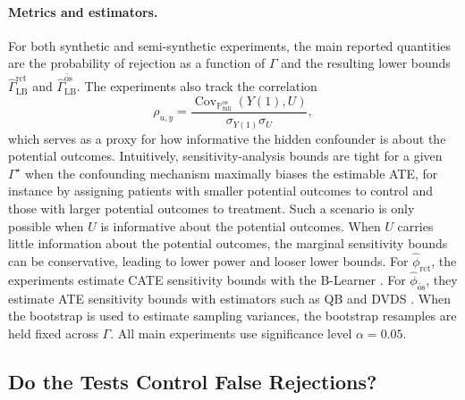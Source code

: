 \paragraph{Metrics and estimators.}
For both synthetic and semi-synthetic experiments, the main reported quantities are the probability of rejection as a function of \(\Gamma\) and the resulting lower bounds \(\widehat{\Gamma}_{\mathrm{LB}}^{\mathrm{rct}}\) and \(\widehat{\Gamma}_{\mathrm{LB}}^{\widetilde{\mathrm{os}}}\). The experiments also track the correlation
\[
  \rho_{u,y}
  =
  \frac{
    \operatorname{Cov}_{\mathbb{P}^{\mathrm{os}}_{\mathrm{full}}}(Y(1),U)
  }{
    \sigma_{Y(1)}\sigma_U
  },
\]
which serves as a proxy for how informative the hidden confounder is about the potential outcomes. Intuitively, sensitivity-analysis bounds are tight for a given \(\Gamma^{\star}\) when the confounding mechanism maximally biases the estimable ATE, for instance by assigning patients with smaller potential outcomes to control and those with larger potential outcomes to treatment. Such a scenario is only possible when \(U\) is informative about the potential outcomes. When \(U\) carries little information about the potential outcomes, the marginal sensitivity bounds can be conservative, leading to lower power and looser lower bounds. For \(\widehat{\phi}_{\mathrm{rct}}\), the experiments estimate CATE sensitivity bounds with the B-Learner \citep{oprescu2023b}. For \(\widehat{\phi}_{\widetilde{\mathrm{os}}}\), they estimate ATE sensitivity bounds with estimators such as QB \citep{dorn2022sharp} and DVDS \citep{dorn2021doubly}. When the bootstrap is used to estimate sampling variances, the bootstrap resamples are held fixed across \(\Gamma\). All main experiments use significance level \(\alpha=0.05\).

\subsection{Do the Tests Control False Rejections?}

